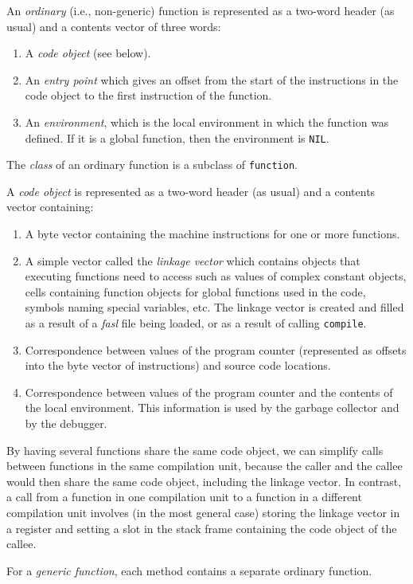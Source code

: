 An \emph{ordinary} (i.e., non-generic) function is represented as a
two-word header (as usual) and a contents vector of three words:

\begin{enumerate}
\item A \emph{code object} (see below).
\item An \emph{entry point} which gives an offset from the start of
  the instructions in the code object to the first instruction of the
  function. 
\item An \emph{environment}, which is the local environment in which
  the function was defined. If it is a global function, then the
  environment is \texttt{NIL}. 
\end{enumerate}

The \emph{class} of an ordinary function is a subclass of
\texttt{function}. 

A \emph{code object} is represented as a two-word header (as usual)
and a contents vector containing:

\begin{enumerate}
\item A byte vector containing the machine instructions for one or
  more functions.
\item A simple vector called the \emph{linkage vector} which contains
  objects that executing functions need to access such as values of
  complex constant objects, cells containing function objects
  for global functions used in the code, symbols naming special
  variables, etc.  The linkage vector is created and filled as a
  result of a \emph{fasl} file being loaded, or as a result of calling
  \texttt{compile}. 
\item Correspondence between values of the program counter
  (represented as offsets into the byte vector of instructions) and
  source code locations.  
\item Correspondence between values of the program counter and the
  contents of the local environment.  This information is used by the
  garbage collector and by the debugger. 
\end{enumerate}

By having several functions share the same code object, we can
simplify calls between functions in the same compilation unit, because
the caller and the callee would then share the same code object,
including the linkage vector.  In contrast, a call from a function in
one compilation unit to a function in a different compilation unit
involves (in the most general case) storing the linkage vector in a
register and setting a slot in the stack frame containing the code
object of the callee. 

For a \emph{generic function}, each method contains a separate
ordinary function.  
